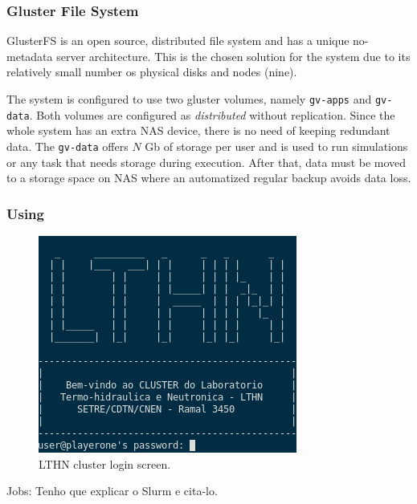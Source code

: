 \documentclass[twoside,a4paper,12pt,english]{inac19}
\begin{document}
\subsubsection{Gluster File System}

GlusterFS\cite{gluster} is an open source, distributed file system and has
a unique no-metadata server architecture. This is the chosen solution for the system due to its relatively
small number os physical disks and nodes (nine).

The system is configured to use two gluster volumes, namely \texttt{gv-apps} and \texttt{gv-data}. Both volumes
are configured as \textit{distributed} without replication. Since the whole system has an extra NAS device, there is
no need of keeping redundant data. The \texttt{gv-data} offers $N$ Gb of storage per user and is used to run simulations or any task that needs storage during execution. After that, data must be moved to a storage space on NAS where an automatized regular backup avoids data loss.

\subsubsection{Using}
\label{ssec:slurm}


\begin{figure}[h] %
  \centering\includegraphics[scale=0.7]{images/p1login.png}
  \caption{LTHN cluster login screen.}
  \label{fig:login-screen}
\end{figure}

Jobs: Tenho que explicar o Slurm\cite{slurm} e cita-lo.

\end{document}
